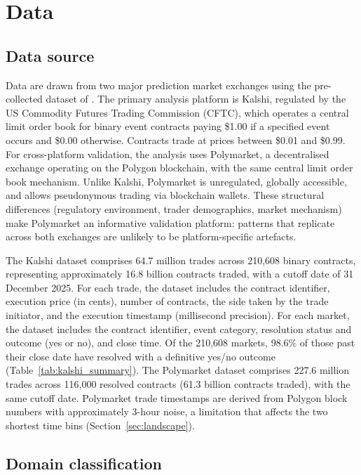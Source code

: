 \documentclass[numsec,webpdf,modern,medium]{oup-authoring-template}
\theoremstyle{thmstyleone}%
\theoremstyle{thmstyletwo}%
\theoremstyle{thmstylethree}%
\begin{document}
\section{Data}\label{sec:data}

\subsection{Data source}\label{sec:datasource}

Data are drawn from two major prediction market exchanges using the pre-collected dataset of \citet{becker2026microstructure}. The primary analysis platform is Kalshi, regulated by the US Commodity Futures Trading Commission (CFTC), which operates a central limit order book for binary event contracts paying \$1.00 if a specified event occurs and \$0.00 otherwise. Contracts trade at prices between \$0.01 and \$0.99. For cross-platform validation, the analysis uses Polymarket, a decentralised exchange operating on the Polygon blockchain, with the same central limit order book mechanism. Unlike Kalshi, Polymarket is unregulated, globally accessible, and allows pseudonymous trading via blockchain wallets. These structural differences (regulatory environment, trader demographics, market mechanism) make Polymarket an informative validation platform: patterns that replicate across both exchanges are unlikely to be platform-specific artefacts.

The Kalshi dataset comprises 64.7 million trades across 210,608 binary contracts, representing approximately 16.8 billion contracts traded, with a cutoff date of 31 December 2025. For each trade, the dataset includes the contract identifier, execution price (in cents), number of contracts, the side taken by the trade initiator, and the execution timestamp (millisecond precision). For each market, the dataset includes the contract identifier, event category, resolution status and outcome (yes or no), and close time. Of the 210,608 markets, 98.6\% of those past their close date have resolved with a definitive yes/no outcome (Table~\ref{tab:kalshi_summary}). The Polymarket dataset comprises 227.6 million trades across 116,000 resolved contracts (61.3 billion contracts traded), with the same cutoff date. Polymarket trade timestamps are derived from Polygon block numbers with approximately 3-hour noise, a limitation that affects the two shortest time bins (Section~\ref{sec:landscape}).
\subsection{Domain classification}\label{sec:domain}
\end{document}
